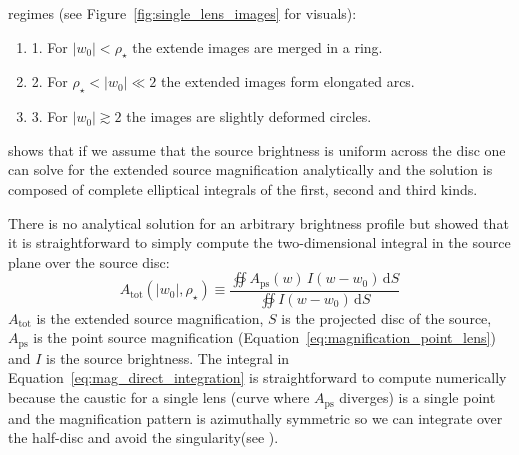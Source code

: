 \documentclass[12pt,dvipsnames]{report}
\newcommand{\ud}{\,\mathrm{d}}
\begin{document}
regimes (see Figure~\ref{fig:single_lens_images} for visuals):
\begin{enumerate}
    \item 1. For $|w_0| < \rho_\star$ the extende images are merged in a ring.
    \item 2. For $\rho_\star < |w_0| \ll 2$ the extended images form elongated arcs.
    \item 3. For $|w_0| \gtrsim  2$ the images are slightly deformed  circles.
\end{enumerate}
\citet{1994ApJ...430..505W} shows that if we assume that the source brightness is
uniform across the disc one can solve for the extended source magnification analytically
and the solution is composed of complete elliptical integrals of the first, second
and third kinds.

There is no analytical solution for an arbitrary brightness profile but
\citet{2009ApJ...695..200L} showed that it is straightforward to simply compute
the two-dimensional integral in the source plane over the source disc:
\begin{equation}
    A_\mathrm{tot}(|w_0|,\rho_\star)\equiv \frac{\oiint A_\mathrm{ps}(w)\,I(w - w_0)\ud S}{
        \oiint I(w - w_0)\ud S}
    \label{eq:mag_direct_integration}
\end{equation}
$A_\mathrm{tot}$ is the extended source magnification, $S$ is the projected
disc of the source, $A_\mathrm{ps}$ is the point source magnification
(Equation~\ref{eq:magnification_point_lens}) and $I$ is the source brightness.
The integral in Equation~\ref{eq:mag_direct_integration} is straightforward to
compute numerically because the caustic for
a single lens (curve where $A_\mathrm{ps}$ diverges) is a single point and
the magnification pattern is azimuthally symmetric so we can integrate over
the half-disc and avoid the singularity(see \citet{2009ApJ...695..200L}).
\end{document}
